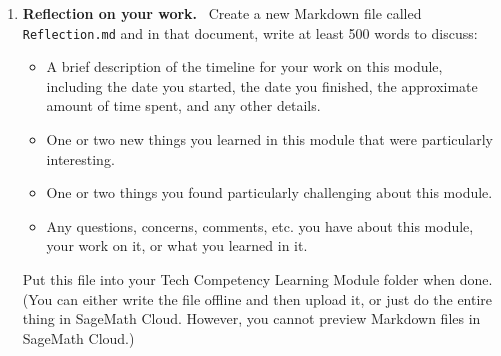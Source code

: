 \documentclass[11pt,letterpaper]{article}
\begin{document}
\begin{enumerate}
\item \textbf{Reflection on your work.} \ Create a new Markdown file called \verb=Reflection.md= and in that document, write at least 500 words to discuss: 
	\begin{itemize}
		\item A brief description of the timeline for your work on this module, including the date you started, the date you finished, the approximate amount of time spent, and any other details.
		\item One or two new things you learned in this module that were particularly interesting. 
		\item One or two things you found particularly challenging about this module. 
		\item Any questions, concerns, comments, etc. you have about this module, your work on it, or what you learned in it. 
	\end{itemize}
Put this file into your Tech Competency Learning Module folder when done. (You can either write the file offline and then upload it, or just do the entire thing in SageMath Cloud. However, you cannot preview Markdown files in SageMath Cloud.) 


\end{enumerate}
\end{document}
